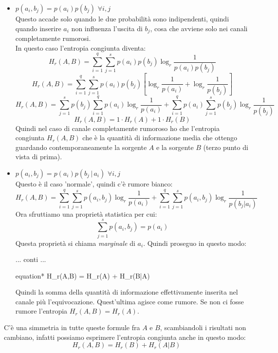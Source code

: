 \begin{itemize}
	\item $p(a_i,b_j)=p(a_i)p(b_j)$   $\forall i, j$\\
	Questo accade solo quando le due probabilità sono indipendenti, quindi quando inserire $a_i$ non influenza l'uscita di $b_j$, cosa che avviene solo nei canali completamente rumorosi.\\
	In questo caso l'entropia congiunta diventa:
	\begin{equation*}
	H_r(A,B) = \sum_{i=1}^q\sum_{j=1}^sp(a_i)p(b_j)\log_r\frac{1}{p(a_i)p(b_j)}
	\end{equation*}
	\begin{equation*}
	H_r(A,B) = \sum_{i=1}^q\sum_{j=1}^sp(a_i)p(b_j)[\log_r\frac{1}{p(a_i)} +  \log_r\frac{1}{p(b_j)}]
	\end{equation*}
	\begin{equation*}
	H_r(A,B) = \sum_{j=1}^sp(b_j)\sum_{i=1}^qp(a_i)\log_r\frac{1}{p(a_i)} +
	\sum_{i=1}^qp(a_i)\sum_{j=1}^sp(b_j)\log_r\frac{1}{p(b_j)}
	\end{equation*}
	\begin{equation*}
	H_r(A,B) = 1 \cdot H_r(A) +
	1 \cdot H_r(B)
	\end{equation*}
	Quindi nel caso di canale completamente rumoroso ho che l'entropia congiunta $H_r(A,B)$ che è la quantità di informazione media che ottengo guardando contemporaneamente la sorgente $A$ e la sorgente $B$ (terzo punto di vista di prima).
	
    \item $p(a_i, b_j)=p(a_i)p(b_j\,|\,a_i)$   $\forall i, j$\\
    Questo è il caso 'normale', quindi c'è rumore bianco:
    \begin{equation*}
	H_r(A,B) = \sum_{i=1}^q\sum_{j=1}^sp(a_i,b_j)\log_r\frac{1}{p(a_i)}+\sum_{i=1}^q\sum_{j=1}^sp(a_i,b_j)\log_r\frac{1}{p(b_j|a_i)}
    \end{equation*}
    Ora sfruttiamo una proprietà statistica per cui:
    \begin{equation*}
    \sum_{j=1}^sp(a_i, b_j) = p(a_i)
    \end{equation*}
    Questa proprietà si chiama \textit{marginale} di $a_i$.
    Quindi proseguo in questo modo:
    \begin{center}
    	... conti ...
	    \end{center}
	\begin{empheq}[box=\tcbhighmath]{equation*}
	H_r(A,B) = H_r(A) + H_r(B|A)
	\end{empheq}
	Quindi la somma della quantità di informazione effettivamente inserita nel canale più l'equivocazione. Quest'ultima agisce come rumore.
	Se non ci fosse rumore l'entropia $H_r(A,B) = H_r(A)$.
\end{itemize}
C'è una simmetria in tutte queste formule fra $A$ e $B$, scambiandoli i risultati non cambiano, infatti possiamo esprimere l'entropia congiunta anche in questo modo:
\begin{equation*}
H_r(A,B) = H_r(B) + H_r(A|B)
\end{equation*}

